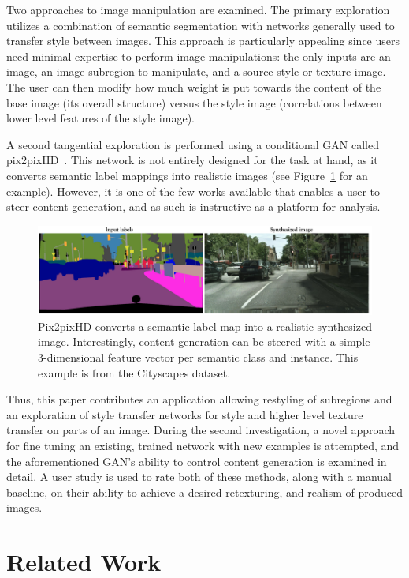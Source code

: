 \documentclass[10pt,twocolumn,letterpaper]{article}
\begin{document}
Two approaches to image manipulation are examined. The primary exploration utilizes a combination of semantic segmentation with networks generally used to transfer style between images. This approach is particularly appealing since users need minimal expertise to perform image manipulations: the only inputs are an image, an image subregion to manipulate, and a source style or texture image. The user can then modify how much weight is put towards the content of the base image (\ie its overall structure) versus the style image (\ie correlations between lower level features of the style image).

A second tangential exploration is performed using a conditional GAN called pix2pixHD~\cite{wang2017high}. This network is not entirely designed for the task at hand, as it converts semantic label mappings into realistic images (see Figure~\ref{fig:pix2pixHD} for an example). However, it is one of the few works available that enables a user to steer content generation, and as such is instructive as a platform for analysis. 

\begin{figure}[t]
\includegraphics[width=\hsize]{images/pix2pixHD.png}
\caption{Pix2pixHD converts a semantic label map into a realistic synthesized image. Interestingly, content generation can be steered with a simple 3-dimensional feature vector per semantic class and instance. This example is from the Cityscapes dataset.}
\label{fig:pix2pixHD}
\end{figure}

Thus, this paper contributes an application allowing restyling of subregions and an exploration of style transfer networks for style and higher level texture transfer on parts of an image. During the second investigation, a novel approach for fine tuning an existing, trained network with new examples is attempted, and the aforementioned GAN's ability to control content generation is examined in detail. A user study is used to rate both of these methods, along with a manual baseline, on their ability to achieve a desired retexturing, and realism of produced images.

\section{Related Work}
\end{document}
